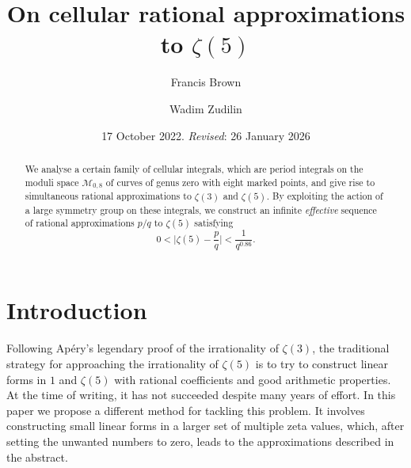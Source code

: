 \documentclass[12pt,reqno]{amsart}
\theoremstyle{remark}
\begin{document}
\title{On cellular rational approximations to $\zeta(5)$}

\author{Francis Brown}
\address{All Souls College, University of Oxford, Oxford, OX1 4AL, UK}

\author{Wadim Zudilin}
\address{Department of Mathematics, IMAPP, Radboud University, PO Box 9010, 6500~GL Nijmegen, Netherlands}

\date{17 October 2022. \emph{Revised}: 26 January 2026}



\begin{abstract}
We analyse a certain family of cellular integrals, which are  period integrals on the moduli space $\mathcal M_{0,8}$ of curves of genus zero with eight marked points, and give  rise to simultaneous rational approximations to $\zeta(3)$ and $\zeta(5)$.
By exploiting the action of a large symmetry group on these integrals, we construct 
an infinite \emph{effective} sequence of rational approximations  $p/q$
to $\zeta(5)$ satisfying
\[
0<\bigg|\zeta(5)-\frac pq\bigg|<\frac1{q^{0.86}}.
\]
\end{abstract}

\maketitle

\section{Introduction}
\label{sec1}

Following Ap\'ery's legendary proof \cite{Ap79} of the irrationality of $\zeta(3)$, the traditional strategy for approaching the irrationality of $\zeta(5)$  is to try to construct linear forms in $1$ and  $\zeta(5)$ with rational coefficients and good arithmetic properties. At the time of writing, it has not succeeded despite many years of effort.  In this paper we propose a  different method for tackling this problem.   It  involves constructing  small linear forms in a larger set of multiple zeta values, which, after setting the unwanted numbers to zero, leads to the approximations described in the abstract. 
\end{document}

